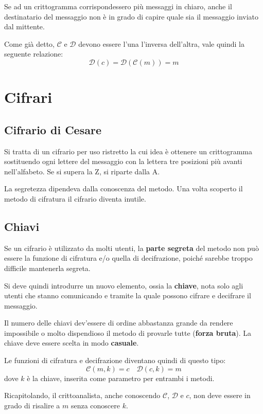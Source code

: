 Se ad un crittogramma corrispondessero pi\`u messaggi in chiaro, anche il destinatario del messaggio non \`e in grado
di capire quale sia il messaggio inviato dal mittente.

Come gi\`a detto, $\mathcal{C}$ e $\mathcal{D}$ devono essere l'una l'inversa dell'altra, vale quindi la seguente
relazione:
\[ \mathcal{D}(c) = \mathcal{D}(\mathcal{C}(m)) = m \]

\section{Cifrari}\label{cifrari}
\subsection{Cifrario di Cesare}
Si tratta di un cifrario per uso ristretto la cui idea \`e ottenere un crittogramma sostituendo ogni lettere del messaggio
con la lettera tre posizioni pi\`u avanti nell'alfabeto. Se si supera la Z, si riparte dalla A.

La segretezza dipendeva dalla conoscenza del metodo. Una volta scoperto il metodo di cifratura il cifrario diventa
inutile.

\subsection{Chiavi}
Se un cifrario \`e utilizzato da molti utenti, la \textbf{parte segreta} del metodo non pu\`o essere la funzione di
cifratura e/o quella di decifrazione, poich\'e sarebbe troppo difficile mantenerla segreta.

Si deve quindi introdurre un nuovo elemento, ossia la \textbf{chiave}, nota solo agli utenti che stanno comunicando e
tramite la quale possono cifrare e decifrare il messaggio.

Il numero delle chiavi dev'essere di ordine abbastanza grande da rendere impossibile o molto dispendioso il metodo di
provarle tutte (\textbf{forza bruta}). La chiave deve essere scelta in modo \textbf{casuale}.

Le funzioni di cifratura e decifrazione diventano quindi di questo tipo:
\[ \mathcal{C}(m, k) = c \quad \mathcal{D}(c, k) = m \]
dove $k$ \`e la chiave, inserita come parametro per entrambi i metodi.

Ricapitolando, il crittoanalista, anche conoscendo $\mathcal{C}$, $\mathcal{D}$ e $c$, non deve essere in grado di
risalire a $m$ senza conoscere $k$.


